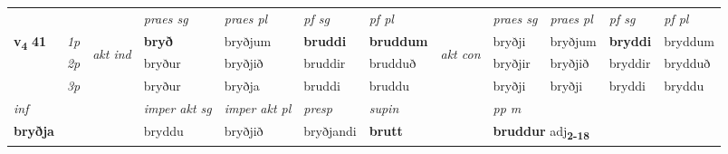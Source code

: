 \begin{longtable}[l]{X>{\footnotesize\itshape}llXXXXlXXXX}
\midrule

 & &   & \textit{praes sg}  & \textit{praes pl}    & \textit{ pf sg} & \textit{pf pl} & & \textit{praes sg}  & \textit{praes pl}    & \textit{pf sg} & \textit{pf pl }  \\ \cmidrule{4-7} \cmidrule{9-12}
 \multirow{2}{*}{{{\textbf{v{\textsubscript{4}}} \Large{\textbf{41}}}}}  & 1p & \multirow{3}{*}{\begin{turn}{90}\textit{akt ind}\end{turn}} & \textbf{bryð} & bryðjum & \textbf{bruddi} & \textbf{bruddum} & \multirow{3}{*}{\begin{turn}{90}\textit{akt con}\end{turn}} &bryðji & bryðjum & \textbf{bryddi} & bryddum\\*
 & 2p &  &  bryður  & bryðjið & bruddir & brudduð & & bryðjir & bryðjið & bryddir & brydduð \\*
 & 3p &  & bryður & bryðja & bruddi & bruddu & & bryðji & bryðji& bryddi & bryddu \\*
\cmidrule{4-7} \cmidrule{9-12}

   {\textit{inf}} & &  & \textit{imper akt sg} & \textit{imper akt pl}   & \textit{presp} & \textit{supin}  && \textit{pp m} \\*
  {\textbf{bryðja}} & && bryddu  & bryðjið   & bryðjandi &  \textbf{brutt}  && \multicolumn{2}{l}{\textbf{bruddur} adj\textbf{\textsubscript{2-18}}} \\*

\midrule


\end{longtable}
